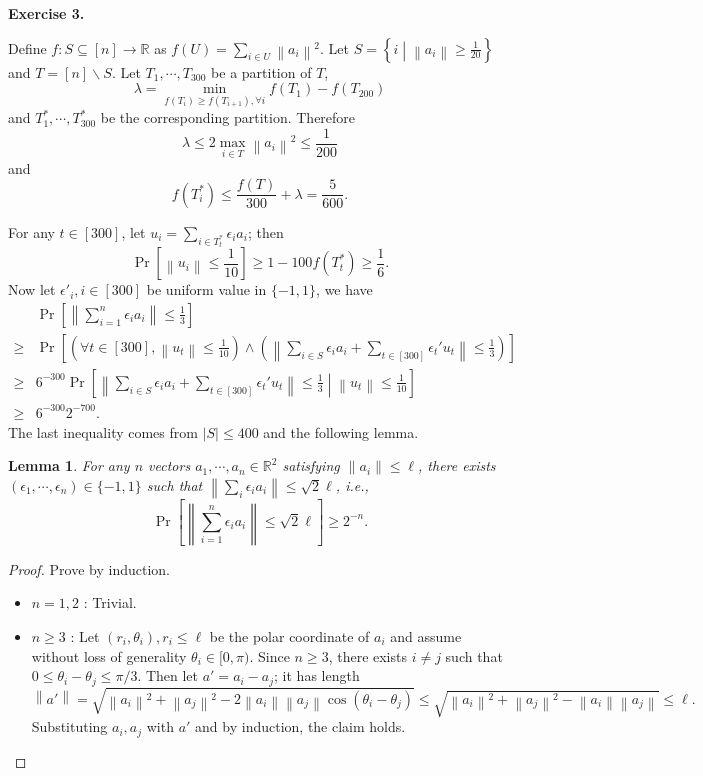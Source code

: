 \documentclass[a4paper]{article}
\newtheorem{lemma}{Lemma}
\newtheorem*{proof}{Proof}
\newenvironment{exercise}[1]{
	\par
	\noindent\textbf{Exercise #1.}\quad
}{
	\par
	\bigskip
}
\newcommand{\vabs}[1]{\left\| #1 \right\|}
\newcommand{\pbra}[1]{\left( #1 \right)}
\newcommand{\cbra}[1]{\left\{ #1 \right\}}
\newcommand{\sbra}[1]{\left[ #1 \right]}
\newcommand{\Rbb}{\mathbb{R}}
\begin{document}
\begin{exercise}{3}
    Define $f:S\subseteq[n]\to\Rbb$ as $f(U)=\sum_{i\in U}\vabs{a_i}^2$.
    Let $S=\cbra{i\middle|\vabs{a_i}\geq\frac1{20}}$ and $T=[n]\backslash S$. 
    Let $T_1,\cdots,T_{300}$ be a partition of $T$,
    $$
    \lambda=\min_{f(T_i)\geq f(T_{i+1}),\forall i}f(T_1)-f(T_{200})
    $$
    and $T^*_1,\cdots,T^*_{300}$ be the corresponding partition. 
    Therefore 
    $$
    \lambda\leq2\max_{i\in T}\vabs{a_i}^2\leq\frac1{200}
    $$ 
    and 
    $$
    f(T^*_i)\leq\frac{f(T)}{300}+\lambda=\frac5{600}.
    $$

    For any $t\in[300]$, let $u_i=\sum_{i\in T^*_t}\epsilon_ia_i$; then 
    $$
    \Pr\sbra{\vabs{u_i}\leq\frac1{10}}\geq1-100f(T^*_t)\geq\frac16.
    $$
    Now let $\epsilon'_i,i\in[300]$ be uniform value in $\{-1,1\}$, we have
    \begin{align*}
        &\Pr\sbra{\vabs{\sum_{i=1}^n\epsilon_ia_i}\leq\frac13}\\
        \geq&\Pr\sbra{\pbra{\forall t\in[300],\vabs{u_t}\leq\frac1{10}}\land
        \pbra{\vabs{\sum_{i\in S}\epsilon_ia_i+\sum_{t\in[300]}\epsilon_t'u_t}\leq\frac13}}\\
        \geq&6^{-300}\Pr\sbra{\vabs{\sum_{i\in S}\epsilon_ia_i+\sum_{t\in[300]}\epsilon_t'u_t}\leq\frac13
        \middle|\vabs{u_t}\leq\frac1{10}}\\
        \geq&6^{-300}2^{-700}.
    \end{align*}
    The last inequality comes from $|S|\leq400$ and the following lemma. 

    \begin{lemma}
        For any $n$ vectors $a_1,\cdots,a_n\in\Rbb^2$ satisfying $\|a_i\|\leq\ell$, there exists 
        $(\epsilon_1,\cdots,\epsilon_n)\in\{-1,1\}$ such that $\vabs{\sum_i\epsilon_ia_i}\leq\sqrt2\ell$, i.e.,
        $$
        \Pr\sbra{\vabs{\sum_{i=1}^n\epsilon_ia_i}\leq\sqrt2\ell}\geq2^{-n}.
        $$
    \end{lemma}
    \begin{proof}
        Prove by induction.
        \begin{itemize}
            \item $n=1,2$ : Trivial.
            \item $n\geq3$ : Let $(r_i,\theta_i),r_i\leq\ell$ be the polar coordinate of $a_i$ and assume without loss of 
                generality $\theta_i\in[0,\pi)$. Since $n\geq3$, there exists $i\neq j$ such that 
                $0\leq\theta_i-\theta_j\leq\pi/3$. Then let $a'=a_i-a_j$; it has length
                $$
                \vabs{a'}=\sqrt{\vabs{a_i}^2+\vabs{a_j}^2-2\vabs{a_i}\vabs{a_j}\cos(\theta_i-\theta_j)}
                \leq\sqrt{\vabs{a_i}^2+\vabs{a_j}^2-\vabs{a_i}\vabs{a_j}}\leq\ell.
                $$
                Substituting $a_i,a_j$ with $a'$ and by induction, the claim holds.
        \end{itemize}
    \end{proof}
\end{exercise}
\end{document}
